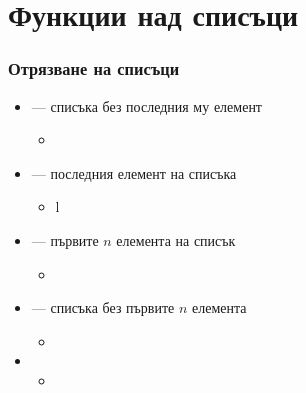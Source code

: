 \documentclass[alsotrans]{beamerswitch}
\begin{document}
\section{Функции над списъци}

\begin{frame}
  \frametitle{Отрязване на списъци}

  \begin{itemize}[<+->]
  \item {} --- списъка без последния му елемент
    \begin{itemize}[<.->]
    \item {}
    \end{itemize}
  \item {} --- последния елемент на списъка
    \begin{itemize}[<.->]
    \item {}l
    \end{itemize}
  \item {} --- първите $n$ елемента на списък
    \begin{itemize}[<.->]
    \item {}
    \end{itemize}
  \item {} --- списъка без първите $n$ елемента
    \begin{itemize}[<.->]
    \item {}
    \end{itemize}
  \item {}
    \begin{itemize}[<.->]
    \item {}
    \end{itemize}
  \end{itemize}
\end{frame}
\end{document}
